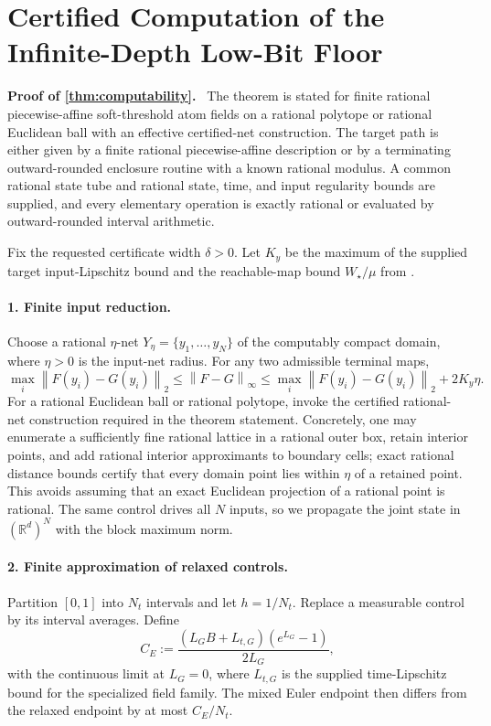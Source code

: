 \documentclass[twoside,11pt]{article}
\renewenvironment{proof}[1][Proof]{\par\noindent\textbf{#1.}\ }{\hfill\BlackBox\par\medskip}
\newcommand{\R}{\mathbb{R}}
\newcommand{\norm}[1]{\left\lVert #1\right\rVert}
\begin{document}
\section{Certified Computation of the Infinite-Depth Low-Bit Floor}
\label{soft:app:computability}

\begin{proof}[Proof of \cref{thm:computability}]
The theorem is stated for finite rational piecewise-affine soft-threshold atom fields on a rational polytope or rational Euclidean ball with an effective certified-net construction.  The target path is either given by a finite rational piecewise-affine description or by a terminating outward-rounded enclosure routine with a known rational modulus.  A common rational state tube and rational state, time, and input regularity bounds are supplied, and every elementary operation is exactly rational or evaluated by outward-rounded interval arithmetic.

Fix the requested certificate width $\delta>0$.  Let $K_y$ be the maximum of the supplied target input-Lipschitz bound and the reachable-map bound $W_\star/\mu$ from .

\paragraph{1. Finite input reduction.}
Choose a rational $\eta$-net $Y_\eta=\{y_1,\ldots,y_N\}$ of the computably compact domain, where $\eta>0$ is the input-net radius.  For any two admissible terminal maps,
\begin{equation}
  \max_i\norm{F(y_i)-G(y_i)}_2
  \le \norm{F-G}_\infty
  \le \max_i\norm{F(y_i)-G(y_i)}_2+2K_y\eta.
  \label{soft:eq:net-bracket}
\end{equation}
For a rational Euclidean ball or rational polytope, invoke the certified rational-net construction required in the theorem statement.  Concretely, one may enumerate a sufficiently fine rational lattice in a rational outer box, retain interior points, and add rational interior approximants to boundary cells; exact rational distance bounds certify that every domain point lies within $\eta$ of a retained point.  This avoids assuming that an exact Euclidean projection of a rational point is rational.  The same control drives all $N$ inputs, so we propagate the joint state in $(\R^d)^N$ with the block maximum norm.

\paragraph{2. Finite approximation of relaxed controls.}
Partition $[0,1]$ into $N_t$ intervals and let $h=1/N_t$. Replace a measurable control by its interval averages. Define
\[
  C_E:=\frac{(L_GB+L_{t,G})(e^{L_G}-1)}{2L_G},
\]
with the continuous limit at $L_G=0$, where $L_{t,G}$ is the supplied time-Lipschitz bound for the specialized field family. The mixed Euler endpoint then differs from the relaxed endpoint by at most $C_E/N_t$.


\end{proof}
\end{document}
